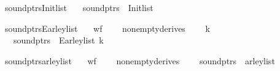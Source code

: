 \begin{isabellebody}
\endisadelimproof
%
\begin{isamarkuptext}%
%
\end{isamarkuptext}\isamarkuptrue%
\isamarkupfalse%
\ sound{\isacharunderscore}{\kern0pt}ptrs{\isacharunderscore}{\kern0pt}Init{\isacharunderscore}{\kern0pt}list{\isacharcolon}{\kern0pt}\isanewline
\ \ \ {\isachardoublequoteopen}sound{\isacharunderscore}{\kern0pt}ptrs\ {\isasymomega}\ {\isacharparenleft}{\kern0pt}Init{\isacharunderscore}{\kern0pt}list\ {\isasymG}\ {\isasymomega}{\isacharparenright}{\kern0pt}{\isachardoublequoteclose}%
\isadelimproof
%
\endisadelimproof
%
\isatagproof
%
\endisatagproof
{\isafoldproof}%
%
\isadelimproof
%
\endisadelimproof
%
\begin{isamarkuptext}%
%
\end{isamarkuptext}\isamarkuptrue%
\isamarkupfalse%
\ sound{\isacharunderscore}{\kern0pt}ptrs{\isacharunderscore}{\kern0pt}Earley{\isacharunderscore}{\kern0pt}list{\isacharcolon}{\kern0pt}\isanewline
\ \ \ {\isachardoublequoteopen}wf{\isacharunderscore}{\kern0pt}{\isasymG}\ {\isasymG}{\isachardoublequoteclose}\isanewline
\ \ \ {\isachardoublequoteopen}nonempty{\isacharunderscore}{\kern0pt}derives\ {\isasymG}{\isachardoublequoteclose}\isanewline
\ \ \ {\isachardoublequoteopen}k\ {\isasymle}\ {\isacharbar}{\kern0pt}{\isasymomega}{\isacharbar}{\kern0pt}{\isachardoublequoteclose}\isanewline
\ \ \ {\isachardoublequoteopen}sound{\isacharunderscore}{\kern0pt}ptrs\ {\isasymomega}\ {\isacharparenleft}{\kern0pt}Earley{\isacharunderscore}{\kern0pt}list\ k\ {\isasymG}\ {\isasymomega}{\isacharparenright}{\kern0pt}{\isachardoublequoteclose}%
\isadelimproof
%
\endisadelimproof
%
\isatagproof
%
\endisatagproof
{\isafoldproof}%
%
\isadelimproof
%
\endisadelimproof
%
\begin{isamarkuptext}%
%
\end{isamarkuptext}\isamarkuptrue%
\isamarkupfalse%
\ sound{\isacharunderscore}{\kern0pt}ptrs{\isacharunderscore}{\kern0pt}{\isasymE}arley{\isacharunderscore}{\kern0pt}list{\isacharcolon}{\kern0pt}\isanewline
\ \ \ {\isachardoublequoteopen}wf{\isacharunderscore}{\kern0pt}{\isasymG}\ {\isasymG}{\isachardoublequoteclose}\isanewline
\ \ \ {\isachardoublequoteopen}nonempty{\isacharunderscore}{\kern0pt}derives\ {\isasymG}{\isachardoublequoteclose}\isanewline
\ \ \ {\isachardoublequoteopen}sound{\isacharunderscore}{\kern0pt}ptrs\ {\isasymomega}\ {\isacharparenleft}{\kern0pt}{\isasymE}arley{\isacharunderscore}{\kern0pt}list\ {\isasymG}\ {\isasymomega}{\isacharparenright}{\kern0pt}{\isachardoublequoteclose}%

\end{isabellebody}

